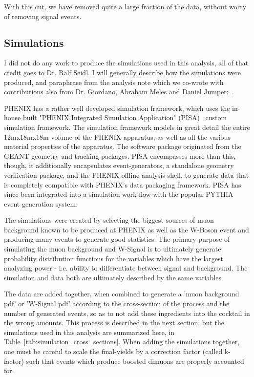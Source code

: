 With this cut, we have removed quite a large fraction of the data, without worry
of removing signal events.

\clearpage
\subsection{Simulations}

I did not do any work to produce the simulations used in this analysis, all of
that credit goes to Dr. Ralf Seidl. I will generally describe how the
simulations were produced, and paraphrase from the analysis note which we
co-wrote with contributions also from Dr. Giordano, Abraham Meles and Daniel
Jumper:~\cite{Seidl2014}.

PHENIX has a rather well developed simulation framework, which uses the in-house
built "PHENIX Integrated Simulation Application" (PISA)~\cite{Macguire1997}
custom simulation framework. The simulation framework models in great detail the
entire 12mx18mx18m volume of the PHENIX apparatus, as well as all the various
material properties of the apparatus. The software package originated from the
GEANT geometry and tracking packages. PISA encompasses more than this, though,
it additionally encapsulates event-generators, a standalone geometry
verification package, and the PHENIX offline analysis shell, to generate data
that is completely compatible with PHENIX's data packaging framework. PISA has
since been integrated into a simulation work-flow with the popular PYTHIA event
generation system.

The simulations were created by selecting the biggest sources of muon
background known to be produced at PHENIX as well as the W-Boson event and
producing many events to generate good statistics. The primary purpose of
simulating the muon background and W-Signal is to ultimately generate
probability distribution functions for the variables which have the largest
analyzing power - i.e. ability to differentiate between signal and background.
The simulation and data both are ultimately described by the same variables.

The data are added together, when combined to generate a 'muon background pdf'
or 'W-Signal pdf' according to the cross-section of the process and the number
of generated events, so as to not add these ingredients into the cocktail in the
wrong amounts. This process is described in the next section, but the
simulations used in this analysis are summarized here, in
Table~\ref{tab:simulation_cross_sections}. When adding the simulations together,
one must be careful to scale the final-yields by a correction factor (called
k-factor) such that events which produce boosted dimuons are properly accounted
for.

